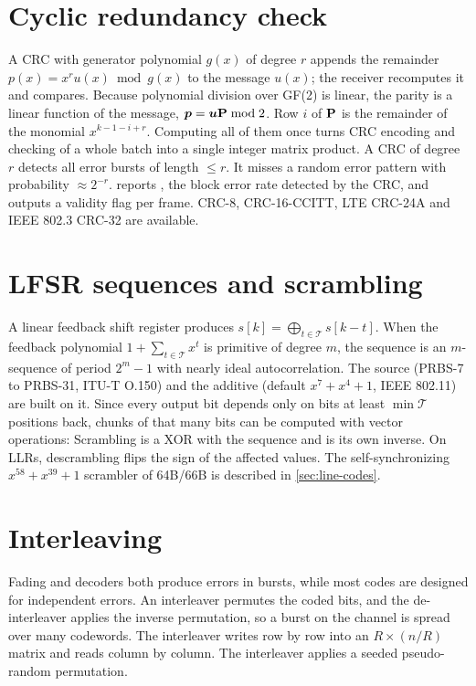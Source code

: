 \section{Cyclic redundancy check}
A CRC with generator polynomial $g(x)$ of degree $r$ appends the remainder
$p(x)=x^r u(x)\bmod g(x)$ to the message $u(x)$; the receiver recomputes it and compares.
Because polynomial division over GF(2) is linear, the parity is a linear function of the
message, $\bm{p}=\bm{u}\mathbf{P}\bmod 2$. Row $i$ of $\mathbf{P}$ is the remainder of the monomial
$x^{k-1-i+r}$. Computing all of them once turns CRC encoding and checking of a whole batch
into a single integer matrix product.
A CRC of degree $r$ detects all error bursts of length $\le r$. It misses a random error
pattern with probability $\approx2^{-r}$.  reports , the block error
rate detected by the CRC, and outputs a validity flag per frame. CRC-8, CRC-16-CCITT, LTE
CRC-24A and IEEE 802.3 CRC-32 are available.

\section{LFSR sequences and scrambling}
A linear feedback shift register produces $s[k]=\bigoplus_{t\in\mathcal T}s[k-t]$. When the
feedback polynomial $1+\sum_{t\in\mathcal T}x^t$ is primitive of degree $m$, the sequence is an
$m$-sequence of period $2^m-1$ with nearly ideal autocorrelation. The  source
(PRBS-7 to PRBS-31, ITU-T O.150) and the additive  (default $x^7+x^4+1$, IEEE
802.11) are built on it. Since every output bit depends only on bits at least
$\min\mathcal T$ positions back, chunks of that many bits can be computed with vector operations:
Scrambling is a XOR with the sequence and is its own inverse. On LLRs, descrambling flips the
sign of the affected values. The self-synchronizing $x^{58}+x^{39}+1$ scrambler of 64B/66B is
described in \cref{sec:line-codes}.

\section{Interleaving}
Fading and decoders both produce errors in bursts, while most codes are designed for
independent errors. An interleaver permutes the coded bits, and the de-interleaver applies the
inverse permutation, so a burst on the channel is spread over many codewords. The
 interleaver writes row by row into an $R\times(n/R)$ matrix and reads column by
column. The  interleaver applies a seeded pseudo-random permutation.

